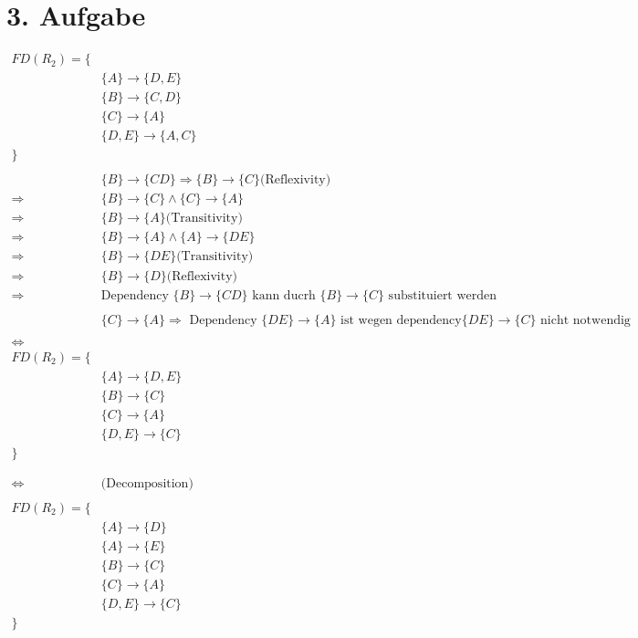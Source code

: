 \section*{3. Aufgabe}

\begin{align*}
FD(R_2) = \{ & \\
& \{A\} \rightarrow \{D, E\} \\
& \{B\} \rightarrow \{C, D\} \\
& \{C\} \rightarrow \{A\} \\
& \{D, E\} \rightarrow \{A, C\} \\
\} & \\ \\
%
& \{B\} \rightarrow \{CD\} \Rightarrow \{B\} \rightarrow \{C\} \text{(Reflexivity)} \\
\Rightarrow & \{B\} \rightarrow \{C\} \land \{C\} \rightarrow \{A\} \\
\Rightarrow & \{B\} \rightarrow \{A\} \text{(Transitivity)} \\
\Rightarrow & \{B\} \rightarrow \{A\} \land \{A\} \rightarrow \{DE\} \\
\Rightarrow & \{B\} \rightarrow \{DE\} \text{(Transitivity)} \\
\Rightarrow & \{B\} \rightarrow \{D\} \text{(Reflexivity)} \\
\Rightarrow & \text{Dependency } \{B\} \rightarrow \{CD\} \text{ kann ducrh } \{B\} \rightarrow \{C\} \text{ substituiert werden} \\ \\
%
& \{C\} \rightarrow \{A\} \Rightarrow \text{ Dependency } \{DE\} \rightarrow \{A\} \text{ ist wegen dependency} \{DE\} \rightarrow \{C\} \text{ nicht notwendig} \\ \\
%
\Leftrightarrow \\
FD(R_2) = \{ & \\
& \{A\} \rightarrow \{D, E\} \\
& \{B\} \rightarrow \{C\} \\
& \{C\} \rightarrow \{A\} \\
& \{D, E\} \rightarrow \{C\} \\
\} & \\ \\ \\
\Leftrightarrow & \text{(Decomposition)} \\ \\
FD(R_2) = \{ & \\
& \{A\} \rightarrow \{D\} \\
& \{A\} \rightarrow \{E\} \\
& \{B\} \rightarrow \{C\} \\
& \{C\} \rightarrow \{A\} \\
& \{D, E\} \rightarrow \{C\} \\
\} & \\ \\ \\
\end{align*}


